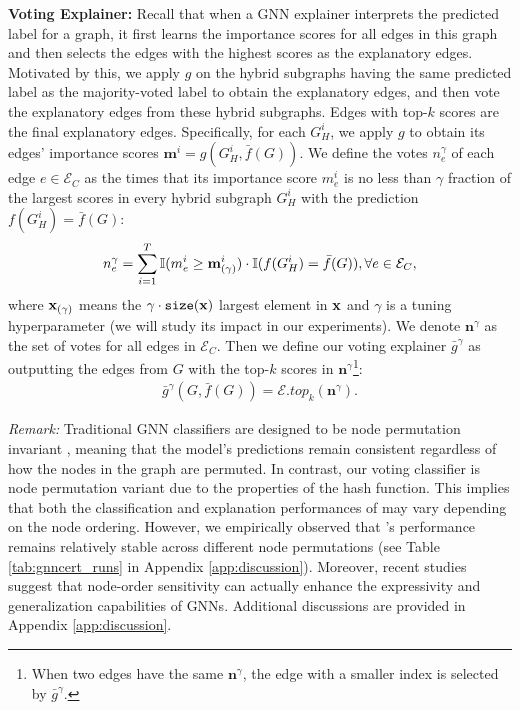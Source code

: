 {\bf Voting Explainer:} 
Recall that when a GNN explainer interprets the predicted label for a graph, it first learns the importance scores for all edges in this graph and then selects the edges with the highest scores as the explanatory edges. 
Motivated by this, we apply $g$ on the hybrid subgraphs  having the same predicted label as the majority-voted label to obtain the explanatory edges,
and then vote the explanatory edges from these hybrid subgraphs. 
Edges with top-$k$ scores are the final explanatory edges. 
Specifically, for each $G_H^{i}$, we apply $g$ to obtain its edges' importance scores $\textbf{m}^{i}=g(G_H^{i},\bar{f}(G))$.  
We define the votes ${n}_{e}^\gamma$ of each edge $e \in \mathcal{E}_{C}$ as the times that its importance score ${m}_{e}^{i}$ is no less than $\gamma$ fraction of the largest scores in every hybrid subgraph $G_H^{i}$ with the prediction $f(G_H^{i})= \bar{f}(G)$: 
{
\begin{align}
\label{eqn:votes}
{n}_{e}^\gamma = \sum_{i=1}^{T} \mathbb{I}({m}_{e}^{i} \geq {\bf m}_{(\gamma)}^{i}) \cdot \mathbb{I}(f(G_H^{i})= \bar{f}(G)), \forall e \in \mathcal{E}_{C},   
\end{align}
}
where ${\bf x}_{(\gamma)}$ means the $\gamma \cdot \texttt{size}({\bf x})$ largest element in ${\bf x}$ and $\gamma$ is a tuning hyperparameter (we will study its impact in our experiments). We denote  $\textbf{n}^{\gamma}$ as the set of votes for all edges in $\mathcal{E}_C$.  Then we define our voting explainer $\bar{g}^{\gamma}$ as outputting the edges from $G$ with the top-$k$ scores in $\textbf{n}^{\gamma}$\footnote{When two edges have the same $\textbf{n}^{\gamma}$, the edge with a smaller index is selected by $\bar{g}^{\gamma}$.}:
\begin{align}
\bar{g}^{\gamma}(G,\bar{f}(G)) = \mathcal{E}.top_{k}(\textbf{n}^{\gamma}).   
\end{align}

{ 
\emph{Remark:}
Traditional GNN classifiers are designed to be node permutation invariant \citep{kipf2017semi,velivckovic2018graph,xu2018powerful}, meaning that the model’s predictions remain consistent regardless of how the nodes in the graph are permuted.
In contrast, our voting classifier is node permutation variant due to the properties of the hash function. This implies that both the classification and explanation performances of {\name} may vary depending on the node ordering. However, we empirically observed that {\name}'s performance remains relatively stable across different node permutations (see Table \ref{tab:gnncert_runs} in Appendix \ref{app:discussion}). 
Moreover, recent studies \citep{Loukas2020What,papp2021dropgnn,huang2022going} suggest that node-order sensitivity can actually enhance the expressivity and generalization capabilities of GNNs. Additional discussions are provided in Appendix \ref{app:discussion}.
}


